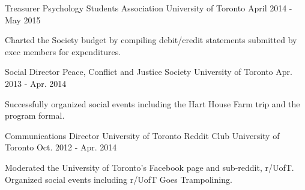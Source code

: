 \begin{cventries}
  \cventry
    {Treasurer} %
    {Psychology Students Association} %
    {University of Toronto} %
    {April 2014 - May 2015} %
    {
      \begin{cvitems} %
        \item {Charted the Society budget by compiling debit/credit statements submitted by exec members for expenditures.}
      \end{cvitems}
    }


  \cventry
    {Social Director} %
    {Peace, Conflict and Justice Society} %
    {University of Toronto} %
    {Apr. 2013 - Apr. 2014} %
    {
      \begin{cvitems} %
        \item {Successfully organized social events including the Hart House Farm trip and the program formal.}
      \end{cvitems}
    }
    
  \cventry
    {Communications Director} %
    {University of Toronto Reddit Club} %
    {University of Toronto} %
    {Oct. 2012 - Apr. 2014} %
    {
      \begin{cvitems} %
        \item {Moderated the University of Toronto’s Facebook page and sub-reddit, r/UofT. Organized social events including r/UofT Goes Trampolining.}
      \end{cvitems}
    }   
\end{cventries}
